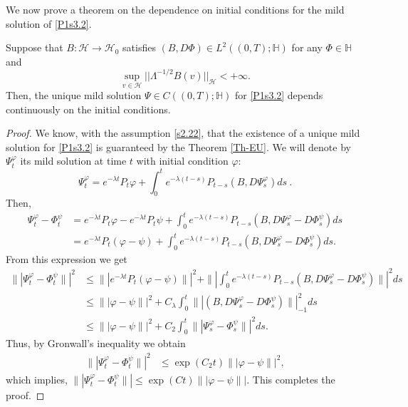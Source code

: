 \documentclass[review,onefignum,onetabnum]{siamart190516}
\begin{document}
 We now prove a theorem on the dependence on initial conditions for the mild
solution of \eqref{P1s3.2}.
\begin{theorem}\label{Cont-Mild-Sol}
    Suppose that 
    $B:
        \mathcal{H}
        \rightarrow 
        \mathcal{H}_0
    $ satisfies 
    $(B,D\Phi)\in L^2((0,T);\mathbb{H})$ 
    for any $\Phi\in\mathbb{H}$ and
    \begin{equation}\label{s2.22}
        \sup_{v\in \mathcal{H}} ||\Lambda^{-1/2}B(v)||_{\mathcal{H}}<+\infty.
    \end{equation}
    Then, the unique mild solution $\Psi\in C((0,T); \mathbb{H})$ for
    \eqref{P1s3.2} depends continuously on the initial conditions.
\end{theorem}
\begin{proof}
We know, with the assumption \eqref{s2.22}, that the existence of a unique
mild solution for \eqref{P1s3.2} is guaranteed by the Theorem \ref{Th-EU}. We
will denote by $\Psi_t^\varphi$ its mild solution at time $t$ with initial
condition $\varphi$:
\begin{equation*}
    \Psi_t^\varphi
    =   e^{-\lambda t} P_t  
    \varphi
    +  
    \int_0^t e^{-\lambda (t-s)} P_{t-s}
    (B,D\Psi_s^\varphi) ds \ .
\end{equation*}
Then,
\begin{align*}
    \Psi_t^\varphi-\Phi_t^\psi
        &=  e^{-\lambda t} P_t \varphi -e^{-\lambda t} P_t
        \psi +  
        \int_0^t e^{-\lambda (t-s)}P_{t-s}(B,D\Psi_s^\varphi-D\Phi_s^\psi) ds
        \\
        &= e^{-\lambda t} P_t (\varphi - \psi) 
        + \int_0^t
            e^{-\lambda(t-s)} P_{t-s} (B, D \Psi_s^\varphi - D\Phi_s^\psi) ds.
\end{align*}
From this expression we get
\begin{align*}
\| | \Psi_t^\varphi-\Phi_t^\psi\| |^2&\le \| |e^{-\lambda t} P_t (\varphi -
\psi)\| |^2+\| | \int_0^t e^{-\lambda
(t-s)}P_{t-s}(B,D\Psi_s^\varphi-D\Phi_s^\psi) \| |^2ds\\
&\le  \|  |\varphi - \psi\| |^2+ C_\lambda\int_0^t  \|
|(B,D\Psi_s^\varphi-D\Phi_s^\psi) \| |_{-1}^2 ds\\
&\le  \|  |\varphi - \psi\| |^2+ C_2\int_0^t  \| |\Psi_s^\varphi-\Phi_s^\psi
\| |^2 ds.
\end{align*}
Thus, by Gronwall's inequality we obtain
\begin{align}\label{s2.23}
    \| |
         \Psi_t^\varphi-\Phi_t^\psi\| |^2&\le \exp(C_2t)  \|  | \varphi - 
         \psi
    \| |^2, 
\end{align}
which implies,
$
\| | \Psi_t^\varphi-\Phi_t^\psi\| |\le \exp(Ct)  \| | \varphi - \psi\| |.
$
This completes the proof.
\end{proof}
\end{document}
